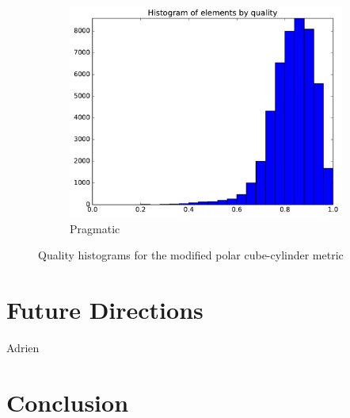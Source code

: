 \documentclass[3p,times,procedia,number]{elsarticle}
\begin{document}
\begin{figure}
\begin{subfigure}{.4\textwidth}
\includegraphics[width=\textwidth]{pragmatic-cube-cylinder-polar-2-quality.pdf}
\caption{Pragmatic}
\end{subfigure}
\caption{Quality histograms for the modified polar cube-cylinder metric}
\label{fig:cube-cylinder-polar-2-qualities}
\end{figure}

\section{Future Directions}
{\color{red} Adrien}

\section{Conclusion}



\end{document}
